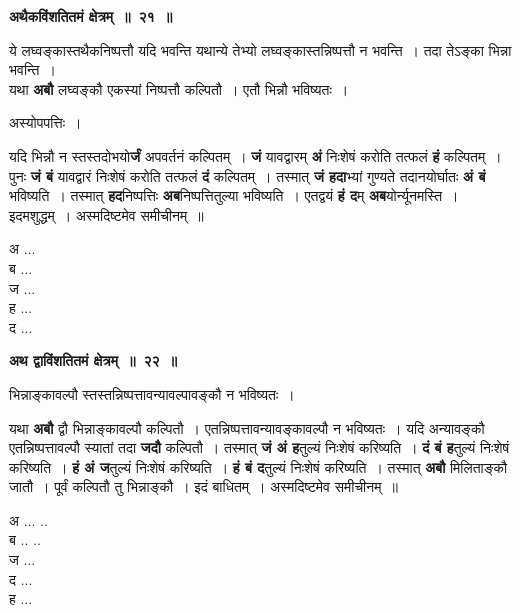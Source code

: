 \documentclass[11pt, openany]{book}
\begin{document}
\begin{center}
\textbf{\large अथैकविंशतितमं क्षेत्रम्~॥~२१~॥}
\end{center}

{\ab ये लघ्वङ्कास्तथैकनिष्पत्तौ यदि भवन्ति यथान्ये तेभ्यो लघ्वङ्कास्तन्निष्पत्तौ न भवन्ति~। तदा तेऽङ्का भिन्ना भवन्ति~। }\\

 यथा \textbf{अबौ} लघ्वङ्कौ एकस्यां निष्पत्तौ कल्पितौ~। एतौ भिन्नौ भविष्यतः~। 
 
\begin{center}
अस्योपपत्तिः~।
\end{center}

\begin{flushleft}
\begin{minipage}[t]{0.75\textwidth}
\hspace{4mm} यदि भिन्नौ न स्तस्तदोभयो\textbf{र्जं} अपवर्तनं कल्पितम्~। \textbf{जं} यावद्वारम् \textbf{अं} निःशेषं करोति तत्फलं \textbf{हं} कल्पितम्~। पुनः \textbf{जं बं} यावद्वारं निःशेषं करोति तत्फलं \textbf{दं} कल्पितम्~। तस्मात् \textbf{जं हदा}भ्यां गुण्यते तदानयोर्घातः \textbf{अं बं} भविष्यति~। तस्मात् \textbf{हद}निष्पत्तिः \textbf{अब}निष्पत्तितुल्या भविष्यति~। एतद्वयं \textbf{हं द}म् \textbf{अब}योर्न्यूनमस्ति~। इदमशुद्धम्~। अस्मदिष्टमेव समीचीनम्~॥ 
\end{minipage} 
\hfill
\begin{minipage}[t]{0.15\textwidth}
अ ...\\
ब ...\\
ज ...\\
ह ... \\
द ...
\end{minipage}
\end{flushleft}

\newpage
\begin{center}
\textbf{\large अथ द्वाविंशतितमं क्षेत्रम्~॥~२२~॥}
\end{center}

{\ab भिन्नाङ्कावल्पौ स्तस्तन्निष्पत्तावन्यावल्पावङ्कौ न भविष्यतः~। }

\begin{flushleft}
\begin{minipage}[t]{0.75\textwidth}
\hspace{4mm} यथा \textbf{अबौ} द्वौ भिन्नाङ्कावल्पौ कल्पितौ~। एतन्निष्पत्तावन्यावङ्कावल्पौ  न भविष्यतः~। यदि अन्यावङ्कौ एतन्निष्पत्तावल्पौ स्यातां तदा \textbf{जदौ} कल्पितौ~। तस्मात् \textbf{जं अं ह}तुल्यं निःशेषं करिष्यति~। \textbf{दं बं ह}तुल्यं निःशेषं करिष्यति~। \textbf{हं अं ज}तुल्यं निःशेषं करिष्यति~। \textbf{हं बं द}तुल्यं निःशेषं करिष्यति~। तस्मात् \textbf{अबौ} मिलिताङ्कौ जातौ~। पूर्वं कल्पितौ तु भिन्नाङ्कौ~। इदं बाधितम्~। अस्मदिष्टमेव समीचीनम्~॥ 
\end{minipage} 
\hfill
\begin{minipage}[t]{0.15\textwidth}
अ ... ..\\
ब .. ..\\
ज ...\\
द ... \\
ह ...
\end{minipage}
\end{flushleft}
\vspace{-1mm}
\end{document}

